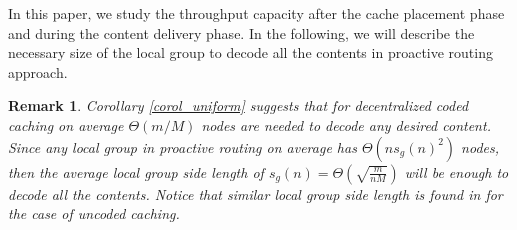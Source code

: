 \documentclass[10pt,journal]{IEEEtran}
\newtheorem{thm}{Theorem}
\newtheorem{rem}{Remark}
\begin{document}
In this paper, we study the throughput capacity after the cache placement phase  and during the content delivery phase. 
In the following, we will describe the necessary size of the local group to decode all the contents in proactive routing approach.
\begin{rem}{\em
Corollary \ref{corol_uniform} suggests that for decentralized coded caching on average $\Theta(m/M)$ nodes are needed to decode any desired content. Since any local group in proactive routing on average has $\Theta (n s_g(n)^2)$ nodes, then the average local group side length of $s_g(n) = \Theta \left(\sqrt{\frac{m}{nM}}\right)$ will be enough to decode all the contents. Notice that similar local group side length is found in \cite{DBLP:conf/icc/JeonHJC15} for the case of uncoded caching.
 }\label{rem_local_group_size}
\end{rem}
\end{document}
